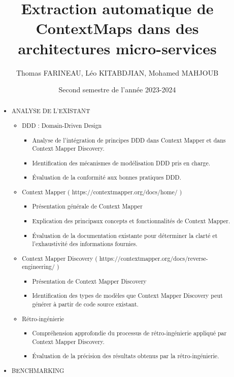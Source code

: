 \documentclass{rapport}
\title{Extraction automatique de ContextMaps dans des architectures micro-services}
\author{Thomas FARINEAU, Léo KITABDJIAN, Mohamed MAHJOUB}
\date{Second semestre de l'année 2023-2024}
\begin{document}
  \maketitle

    \begin{abstract}
        \begin{itemize}
            \item ANALYSE DE L'EXISTANT \begin{itemize}
                \item DDD : Domain-Driven Design \begin{itemize}
                    \item Analyse de l'intégration de principes DDD dans Context Mapper et dans Context Mapper Discovery.
                    \item Identification des mécanismes de modélisation DDD pris en charge.
                    \item Évaluation de la conformité aux bonnes pratiques DDD.
                \end{itemize}
                \item Context Mapper ( https://contextmapper.org/docs/home/ ) \begin{itemize}
                    \item Présentation générale de Context Mapper
                    \item Explication des principaux concepts et fonctionnalités de Context Mapper.
                    \item Évaluation de la documentation existante pour déterminer la clarté et l'exhaustivité des informations fournies.
                \end{itemize}
                \item Context Mapper Discovery ( https://contextmapper.org/docs/reverse-engineering/ ) \begin{itemize}
                    \item Présentation de Context Mapper Discovery
                    \item Identification des types de modèles que Context Mapper Discovery peut générer à partir de code source existant.
                \end{itemize}
                \item Rétro-ingénierie \begin{itemize}
                    \item Compréhension approfondie du processus de rétro-ingénierie appliqué par Context Mapper Discovery.
                    \item Évaluation de la précision des résultats obtenus par la rétro-ingénierie.
                \end{itemize}
            \end{itemize} 
            \item BENCHMARKING


\end{itemize}
\end{abstract}
\end{document}

